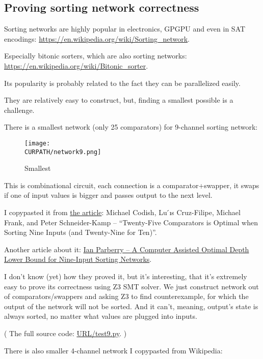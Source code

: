 \subsection{Proving sorting network correctness}

\renewcommand{\CURPATH}{proofs/sorting_network}

Sorting networks are highly popular in electronics, GPGPU and even in SAT encodings:
\url{https://en.wikipedia.org/wiki/Sorting_network}.

Especially bitonic sorters, which are also sorting networks:
\url{https://en.wikipedia.org/wiki/Bitonic_sorter}.

Its popularity is probably related to the fact they can be parallelized easily.

They are relatively easy to construct, but, finding a smallest possible is a challenge.

There is a smallest network (only 25 comparators) for 9-channel sorting network:

\begin{figure}[H]
\label{fig:pipe_shuffled}
\centering
\texttt{[image: \\CURPATH/network9.png]}
\caption{Smallest}
\end{figure}

This is combinational circuit, each connection is a comparator+swapper, it swaps if one of input values is bigger and passes output to the next level.

I copypasted it from \href{https://arxiv.org/pdf/1405.5754.pdf}{the article}:
Michael Codish, Lu ́ıs Cruz-Filipe, Michael Frank, and Peter Schneider-Kamp --
``Twenty-Five Comparators is Optimal when Sorting Nine Inputs (and Twenty-Nine for Ten)''.

Another article about it: \href{http://larc.unt.edu/ian/pubs/9-input.pdf}{Ian Parberry -- A Computer Assisted Optimal Depth Lower Bound for Nine-Input Sorting Networks}.

I don't know (yet) how they proved it, but it's interesting, that it's extremely easy to prove its correctness using Z3 SMT solver.
We just construct network out of comparators/swappers and asking Z3 to find counterexample, for which the output of the network will not be sorted.
And it can't, meaning, output's state is always sorted, no matter what values are plugged into inputs.



( The full source code: \url{URL/test9.py}. )

There is also smaller 4-channel network I copypasted from Wikipedia:

